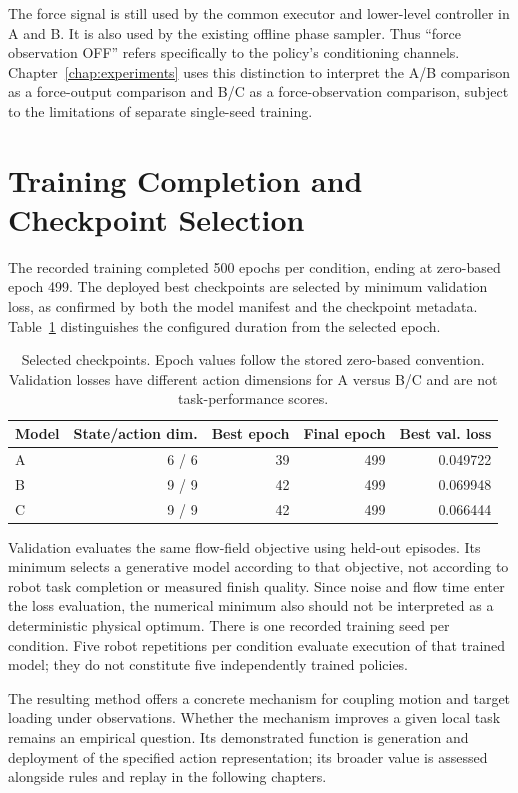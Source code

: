 The force signal is still used by the common executor and lower-level controller in A and B. It is also used by the existing offline phase sampler. Thus ``force observation OFF'' refers specifically to the policy's conditioning channels. Chapter~\ref{chap:experiments} uses this distinction to interpret the A/B comparison as a force-output comparison and B/C as a force-observation comparison, subject to the limitations of separate single-seed training.

\section{Training Completion and Checkpoint Selection}
The recorded training completed 500 epochs per condition, ending at zero-based epoch 499. The deployed best checkpoints are selected by minimum validation loss, as confirmed by both the model manifest and the checkpoint metadata. Table~\ref{tab:checkpoints} distinguishes the configured duration from the selected epoch.

\begin{table}[tbp]\centering\small
\caption[Selected checkpoint epochs]{Selected checkpoints. Epoch values follow the stored zero-based convention. Validation losses have different action dimensions for A versus B/C and are not task-performance scores.}
\label{tab:checkpoints}
\begin{tabular}{lrrrr}
\toprule Model & State/action dim. & Best epoch & Final epoch & Best val. loss \\ \midrule
A & 6 / 6 & 39 & 499 & 0.049722 \\
B & 9 / 9 & 42 & 499 & 0.069948 \\
C & 9 / 9 & 42 & 499 & 0.066444 \\
\bottomrule
\end{tabular}
\end{table}

Validation evaluates the same flow-field objective using held-out episodes. Its minimum selects a generative model according to that objective, not according to robot task completion or measured finish quality. Since noise and flow time enter the loss evaluation, the numerical minimum also should not be interpreted as a deterministic physical optimum. There is one recorded training seed per condition. Five robot repetitions per condition evaluate execution of that trained model; they do not constitute five independently trained policies.

The resulting method offers a concrete mechanism for coupling motion and target loading under observations. Whether the mechanism improves a given local task remains an empirical question. Its demonstrated function is generation and deployment of the specified action representation; its broader value is assessed alongside rules and replay in the following chapters.
